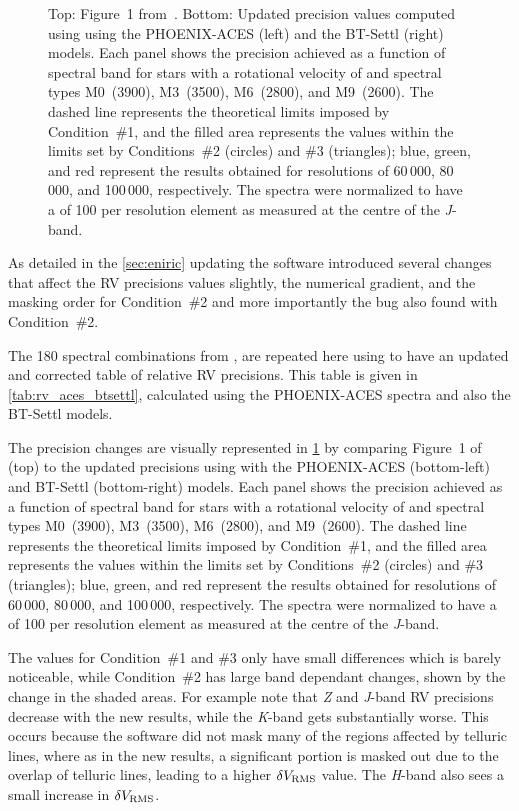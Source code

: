 \begin{figure}
{        Top: Figure~1 from~\citet{figueira_radial_2016}.
        Bottom: Updated precision values computed using \eniric{} using the {PHOENIX-ACES} (left) and the {BT-Settl} (right) models.
        Each panel shows the precision achieved as a function of spectral band for stars with a rotational velocity of \kmps{} and spectral types {M0}~(3900\K), {M3}~(3500\K), {M6}~(2800\K), and {M9}~(2600\K{}).
        The dashed line represents the theoretical limits imposed by Condition~\#1, and the filled area represents the values within the limits set by Conditions~\#2 (circles) and \#3 (triangles); blue, green, and red represent the results obtained for resolutions of 60\,000, 80\,000, and 100\,000, respectively.
        The spectra were normalized to have a \snr{} of 100 per resolution element as measured at the centre of the \emph{J}-band.}
    \label{fig:figueria_comparision}
\end{figure}

As detailed in the \cref{sec:eniric} updating the software introduced several changes that affect the {RV} precisions values slightly, the numerical gradient, and the masking order for Condition~\#2 and more importantly the bug also found with Condition~\#2.

The 180 spectral combinations from \citet{figueira_radial_2016}, are repeated here using \eniric{} to have an updated and corrected table of relative {RV} precisions.
This table is given in \cref{tab:rv_aces_btsettl}, calculated using the {PHOENIX-ACES} spectra and also the {BT-Settl} models.
 
The precision changes are visually represented in \cref{fig:figueria_comparision} by comparing Figure~1 of \citet{figueira_radial_2016} (top) to the updated precisions using \eniric{} with the {PHOENIX-ACES} (bottom-left) and {BT-Settl} (bottom-right) models.
Each panel shows the precision achieved as a function of spectral band for stars with a rotational velocity of \kmps{} and spectral types {M0}~(3900\K), {M3}~(3500\K), {M6}~(2800\K), and {M9}~(2600\K).
The dashed line represents the theoretical limits imposed by Condition~\#1, and the filled area represents the values within the limits set by Conditions~\#2 (circles) and \#3 (triangles); blue, green, and red represent the results obtained for resolutions of 60\,000, 80\,000, and 100\,000, respectively.
The spectra were normalized to have a \snr{} of 100 per resolution element as measured at the centre of the \emph{J}-band.

The values for Condition~\#1 and \#3 only have small differences which is barely noticeable, while Condition~\#2 has large band dependant changes, shown by the change in the shaded areas.
For example note that \emph{Z} and \emph{J}-band {RV} precisions decrease with the new results, while the \emph{K}-band gets substantially worse.
This occurs because the software did not mask many of the regions affected by telluric lines, where as in the new results, a significant portion is masked out due to the overlap of telluric lines, leading to a higher \(\delta V_{\textrm{RMS}}\) value.
The \emph{H}-band also sees a small increase in \(\delta V_{\textrm{RMS}}\).

